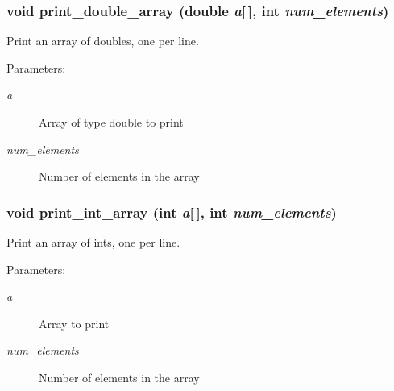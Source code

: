 \subsubsection{\setlength{\rightskip}{0pt plus 5cm}void print\_\-double\_\-array (double {\em a}[$\,$], int {\em num\_\-elements})}\label{print__arrays_8c_9dd571958cd875e3ad558c23cea161d3}


Print an array of doubles, one per line. \begin{Desc}
\item[Parameters:]
\begin{description}
\item[{\em a}]Array of type double to print \item[{\em num\_\-elements}]Number of elements in the array \end{description}
\end{Desc}
\subsubsection{\setlength{\rightskip}{0pt plus 5cm}void print\_\-int\_\-array (int {\em a}[$\,$], int {\em num\_\-elements})}\label{print__arrays_8c_56fe614d6cfded99e4e9704f9f86ae22}


Print an array of ints, one per line. \begin{Desc}
\item[Parameters:]
\begin{description}
\item[{\em a}]Array to print \item[{\em num\_\-elements}]Number of elements in the array \end{description}
\end{Desc}
